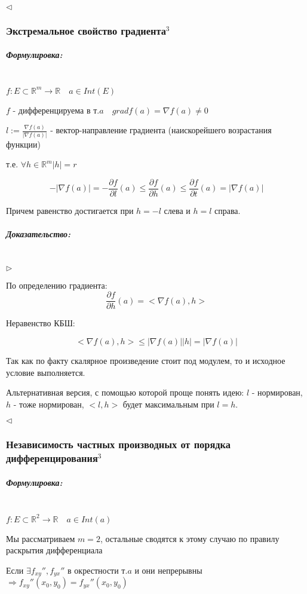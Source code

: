 \documentclass{article}
\let\vanillasubparagraph\subparagraph
\renewcommand{\subparagraph}[1]{\vanillasubparagraph{#1}\mbox{}\\}
\begin{document}
$\lhd$

\subsubsection{Экстремальное свойство градиента\texorpdfstring{$^3$}{}}


\subparagraph{Формулировка: }

$f: E\subset \mathbb{R}^m \to \mathbb R \quad a \in Int(E)$

$f$ - дифференцируема в т.$a \quad grad f(a) = \nabla f(a) \neq 0$

$l:= \frac{\nabla f(a)} {|\nabla f(a)|}$ - вектор-направление градиента (наискорейшего возрастания функции)

т.е. $\forall h \in \mathbb R^m |h| = r$

$$
-|\nabla f(a)| = -\frac{\partial f}{\partial l}(a) \leq \frac{\partial f}{\partial h}(a) \leq \frac{\partial f}{\partial t} (a) = |\nabla f(a)|
$$

Причем равенство достигается при $h = -l$ слева и $h = l$ справа.

\subparagraph{Доказательство: }

$\rhd$

По определению градиента:
$$
\frac{\partial f}{\partial h} (a) = <\nabla f(a), h>
$$

Неравенство КБШ:

$$
<\nabla f(a), h> \leq |\nabla f(a)| |h| = |\nabla f(a)|
$$

Так как по факту скалярное произведение стоит под модулем, то и исходное условие выполняется.

Альтернативная версия, с помощью которой проще понять идею: $l$ - нормирован, $h$ - тоже нормирован, $<l, h>$ будет максимальным при $l=h$.

$\lhd$

\subsubsection{Независимость частных производных от порядка дифференцирования\texorpdfstring{$^3$}{}}

\subparagraph{Формулировка: }

$f:E \subset \mathbb R ^2 \to \mathbb R \quad a \in Int(a)$

Мы рассматриваем $m = 2$, остальные сводятся к этому случаю по правилу раскрытия дифференциала

Если $\exists f_{xy}'', f_{yx}''$ в окрестности т.$a$ и они непрерывны $\Rightarrow f_{xy}''(x_0, y_0) = f_{yx}''(x_0, y_0)$
\end{document}
